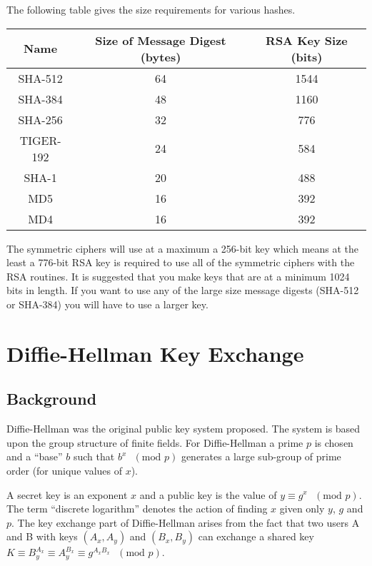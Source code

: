 \documentclass{book}
\begin{document}
The following table gives the size requirements for various hashes.
\begin{center}
\begin{tabular}{|c|c|c|}
      \hline Name & Size of Message Digest (bytes) & RSA Key Size (bits)\\
      \hline SHA-512 & 64 & 1544\\
      \hline SHA-384 & 48 & 1160 \\
      \hline SHA-256 & 32 & 776\\
      \hline TIGER-192 & 24 & 584\\
      \hline SHA-1 & 20 & 488\\
      \hline MD5 & 16 & 392\\
      \hline MD4 & 16 & 392\\
      \hline
\end{tabular}
\end{center}

The symmetric ciphers will use at a maximum a 256-bit key which means at the least a 776-bit RSA key is 
required to use all of the symmetric ciphers with the RSA routines.  It is suggested that you make keys that 
are at a minimum 1024 bits in length.  If you want to use any of the large size message digests 
(SHA-512 or SHA-384) you will have to use a larger key.

\chapter{Diffie-Hellman Key Exchange}

\section{Background}

Diffie-Hellman was the original public key system proposed.  The system is based upon the group structure
of finite fields.  For Diffie-Hellman a prime $p$ is chosen and a ``base'' $b$ such that $b^x\mbox{ }(\mbox{mod }p)$ 
generates a large sub-group of prime order (for unique values of $x$).

A secret key is an exponent $x$ and a public key is the value of $y \equiv g^x\mbox{ }(\mbox{mod }p)$.  The term
``discrete logarithm'' denotes the action of finding $x$ given only $y$, $g$ and $p$.  The key exchange part of
Diffie-Hellman arises from the fact that two users A and B with keys $(A_x, A_y)$ and $(B_x, B_y)$ can exchange 
a shared key $K \equiv B_y^{A_x} \equiv A_y^{B_x} \equiv g^{A_xB_x}\mbox{ }(\mbox{mod }p)$.
\end{document}
